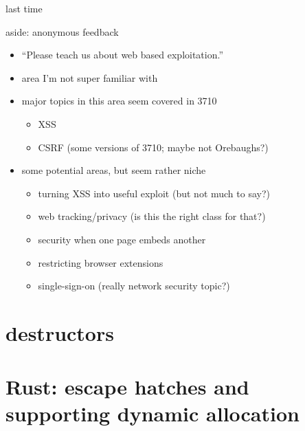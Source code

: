 \date{}
\title{}
\date{}
\usepackage[outputdir=latex.out]{minted}

\begin{frame}
    \titlepage
\end{frame}

\begin{frame}{last time}
\end{frame}



\begin{frame}{aside: anonymous feedback}
    \begin{itemize}
    \item ``Please teach us about web based exploitation.''
    \item area I'm not super familiar with
    \item major topics in this area seem covered in 3710
        \begin{itemize}
        \item XSS 
        \item CSRF (some versions of 3710; maybe not Orebaughs?)
        \end{itemize}
    \item some potential areas, but seem rather niche
        \begin{itemize}
        \item turning XSS into useful exploit (but not much to say?)
        \item web tracking/privacy (is this the right class for that?)
        \item security when one page embeds another
        \item restricting browser extensions
        \item single-sign-on (really network security topic?)
        \end{itemize}
    \end{itemize}
\end{frame}

\section{destructors}


\section{Rust: escape hatches and supporting dynamic allocation}


